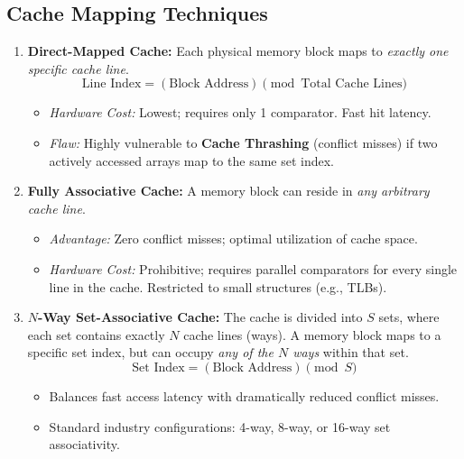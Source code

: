 \subsection{Cache Mapping Techniques}
\begin{enumerate}[label=\bfseries\arabic*.]
    \item \textbf{Direct-Mapped Cache:} Each physical memory block maps to \textit{exactly one specific cache line}.
    \begin{equation}
    \label{eq:direct_map_set}
    \text{Line Index} = (\text{Block Address}) \pmod{\text{Total Cache Lines}}
    \end{equation}
    \begin{itemize}
        \item \textit{Hardware Cost:} Lowest; requires only 1 comparator. Fast hit latency.
        \item \textit{Flaw:} Highly vulnerable to \textbf{Cache Thrashing} (conflict misses) if two actively accessed arrays map to the same set index.
    \end{itemize}
    \item \textbf{Fully Associative Cache:} A memory block can reside in \textit{any arbitrary cache line}.
    \begin{itemize}
        \item \textit{Advantage:} Zero conflict misses; optimal utilization of cache space.
        \item \textit{Hardware Cost:} Prohibitive; requires parallel comparators for every single line in the cache. Restricted to small structures (e.g., TLBs).
    \end{itemize}
    \item \textbf{$N$-Way Set-Associative Cache:} The cache is divided into $S$ sets, where each set contains exactly $N$ cache lines (ways). A memory block maps to a specific set index, but can occupy \textit{any of the $N$ ways} within that set.
    \begin{equation}
    \label{eq:set_assoc_index}
    \text{Set Index} = (\text{Block Address}) \pmod{S}
    \end{equation}
    \begin{itemize}
        \item Balances fast access latency with dramatically reduced conflict misses.
        \item Standard industry configurations: 4-way, 8-way, or 16-way set associativity.
    \end{itemize}
\end{enumerate}

